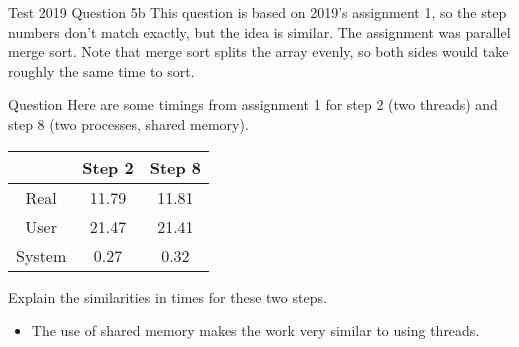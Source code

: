 \documentclass[notes]{beamer}
\begin{document}
\begin{frame}{Test 2019 Question 5b}
    This question is based on 2019's assignment 1, so the step numbers don't match exactly, but the idea is similar. The assignment was parallel merge sort. Note that merge sort splits the array evenly, so both sides would take roughly the same time to sort.
    \begin{alertblock}{Question}
        Here are some timings from assignment 1 for step 2 (two threads) and step 8 (two processes, shared memory).
        \begin{table}
            \centering
            \begin{tabular}{c|c|c}
                \hline
                       & Step 2 & Step 8 \\ \hline
                Real   & 11.79  & 11.81  \\ \hline
                User   & 21.47  & 21.41  \\ \hline
                System & 0.27   & 0.32   \\ \hline
            \end{tabular}
        \end{table}
        Explain the similarities in times for these two steps.
    \end{alertblock}
    \pause
    \begin{itemize}
        \item The use of shared memory makes the work very similar to using threads.
    \end{itemize}
\end{frame}
\end{document}
